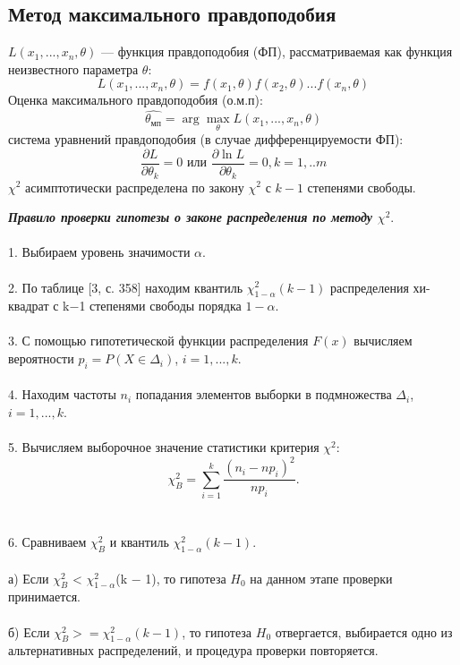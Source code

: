\subsection{Метод максимального правдоподобия}
$L(x_{1},... ,x_{n}, \theta)$ — функция правдоподобия (ФП),
рассматриваемая как функция неизвестного параметра $\theta$:
\begin{equation}
L(x_{1},...,x_{n},\theta) = f(x_{1},\theta)f(x_{2},\theta)...f(x_{n}, \theta)
\label{eq:l()}
\end{equation}
Оценка максимального правдоподобия (о.м.п):
\begin{equation}
\hat{\theta_{\text{мп}}} = \arg \max_{\theta}L(x_{1},...,x_{n},\theta)
\end{equation}
система уравнений правдоподобия (в случае дифференцируемости ФП):
\begin{equation}
\frac{\partial L}{\partial \theta_{k}} = 0 \text{  или  } \frac{\partial \ln L}{\partial \theta_{k}} = 0, k = 1,..m
\end{equation}
$\chi^{2}$ асимптотически распределена по закону $\chi^{2}$ с $k-1$ степенями свободы.

\textbf{\textit{Правило проверки гипотезы о законе распределения по методу $\chi^{2}$}}.
\\\\
1. Выбираем уровень значимости $\alpha$.
\\\\
2. По таблице [3, с. 358] находим квантиль $\chi^{2}_{1-\alpha}(k - 1)$ распределения хи-квадрат с k$-$1 степенями свободы порядка $1-\alpha$.
\\\\
3. С помощью гипотетической функции распределения $F(x)$ вычисляем вероятности $p_{i} = P (X \in \Delta_{i})$, $i = 1, ... ,k$.
\\\\
4. Находим частоты $n_{i}$ попадания элементов выборки в подмножества $\Delta_{i}$, $i = 1, ... ,k$.
\\\\
5. Вычисляем выборочное значение статистики критерия $\chi^{2}$:
\begin{equation}
\chi^{2}_{B} =\sum_{i = 1}^{k}{\frac{(n_{i} - np_{i})^{2}}{np_{i}}}.
\label{chi_B}
\end{equation}
\\\\
6. Сравниваем $\chi^{2}_{B}$ и квантиль $\chi^{2}_{1-\alpha}(k-1)$.
\\\\
а) Если $\chi^{2}_{B}$ < $\chi^{2}_{1-\alpha}$(k $-$ 1), то гипотеза $H_{0}$ на данном этапе проверки принимается.
\\\\
б) Если $\chi^{2}_{B} >= \chi^{2}_{1-\alpha}(k -1)$, то гипотеза $H_{0}$ отвергается, выбирается одно из альтернативных распределений, и процедура проверки повторяется.
